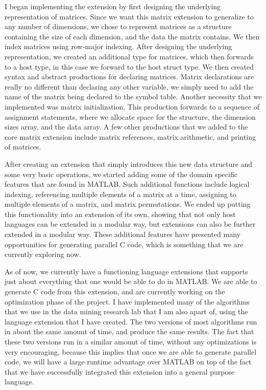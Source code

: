\documentclass[a4paper,12pt]{article}
\begin{document}
I began implementing the extension by first designing the underlying representation of matrices. Since we want this matrix extension to generalize to any number of dimensions, we chose to represent matrices as a structure containing the size of each dimension, and the data the matrix contains. We then index matrices using row-major indexing. After designing the underlying representation, we created an additional type for matrices, which then forwards to a host type, in this case we forward to the host struct type. We then created syntax and abstract productions for declaring matrices.  Matrix declarations are really no different than declaring any other variable, we simply need to add the name of the matrix being declared to the symbol table. Another necessity that we implemented was matrix initialization. This production forwards to a sequence of assignment statements, where we allocate space for the structure, the dimension sizes array, and the data array. A few other productions that we added to the core matrix extension include matrix references, matrix arithmetic, and printing of matrices.  

After creating an extension that simply introduces this new data structure and some very basic operations, we started adding some of the domain specific features that are found in MATLAB.  Such additional functions include logical indexing, referencing multiple elements of a matrix at a time, assigning to multiple elements of a matrix, and matrix permutations.  We ended up putting this functionality into an extension of its own, showing that not only host languages can be extended in a modular way, but extensions can also be further extended in a modular way.  These additional features have presented many opportunities for generating parallel C code, which is something that we are currently exploring now.

As of now, we currently have a functioning language extensions that supports just about everything that one would be able to do in MATLAB.  We are able to generate C code from this extension, and are currently working on the optimization phase of the project.  I have implemented many of the algorithms that we use in the data mining research lab that I am also apart of, using the language extension that I have created.  The two versions of most algorithms run in about the same amount of time, and produce the same results.  The fact that these two versions run in a similar amount of time, without any optimizations is very encouraging, because this implies that once we are able to generate parallel code, we will have a large runtime advantage over MATLAB on top of the fact that we have successfully integrated this extension into a general purpose language.
\end{document}
